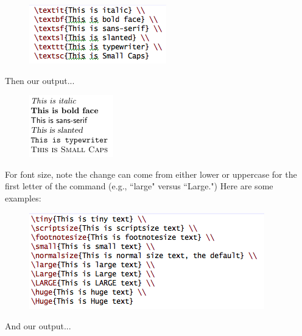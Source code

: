 \documentclass[11pt]{article}
\begin{document}
\begin{figure}[!h]
	\includegraphics[scale=.7]{CODE4} \\ %
\end{figure}

	Then our output... \\

\begin{figure}[!h]
	\includegraphics[scale=.7]{OUT4} \\ %
	\centering
\end{figure}	
	
	For font size, note the change can come from either lower or uppercase for the first letter of the command (e.g., ``large" versus ``Large.") Here are some examples: \\

\begin{figure}[!h]
	\includegraphics[scale=.7]{CODE5} \\ %
\end{figure}	

\newpage

	And our output... \\
\end{document}
